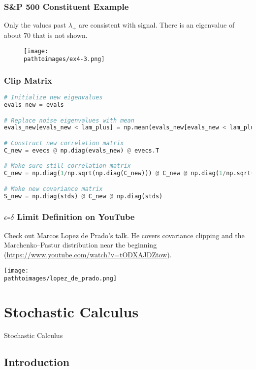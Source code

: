 \documentclass{beamer}
\newcommand{\pathtoimages}{/Users/charlesrambo/Desktop/Bootcamp24/Images}
\begin{document}
\begin{frame}[fragile]
\frametitle{S\&P 500 Constituent Example}
Only the values past $\lambda_+$ are consistent with signal. There is an eigenvalue of about 70 that is not shown.
\begin{figure}
\centering
\texttt{[image: \\pathtoimages/ex4-3.png]}
\end{figure}

\end{frame}


\begin{frame}[fragile]
\frametitle{Clip Matrix}
\begin{lstlisting}[language=Python]
# Initialize new eigenvalues
evals_new = evals

# Replace noise eigenvalues with mean
evals_new[evals_new < lam_plus] = np.mean(evals_new[evals_new < lam_plus])

# Construct new correlation matrix
C_new = evecs @ np.diag(evals_new) @ evecs.T

# Make sure still correlation matrix
C_new = np.diag(1/np.sqrt(np.diag(C_new))) @ C_new @ np.diag(1/np.sqrt(np.diag(C_new)))

# Make new covariance matrix
S_new = np.diag(stds) @ C_new @ np.diag(stds)
\end{lstlisting}
\end{frame}

\begin{frame}
\frametitle{$\epsilon$-$\delta$ Limit Definition on YouTube}
Check out Marcos Lopez de Prado's talk. He covers covariance clipping and the Marchenko–Pastur distribution near the beginning  {\tiny(\url{https://www.youtube.com/watch?v=tODXAJDZtow})}.
\begin{center}
\texttt{[image: \\pathtoimages/lopez\_de\_prado.png]}
\end{center}
\end{frame}

\section{Stochastic Calculus} 

\begin{frame}
\begin{center}
\Huge Stochastic Calculus
\end{center}
\end{frame}

\subsection{Introduction} 
\end{document}

